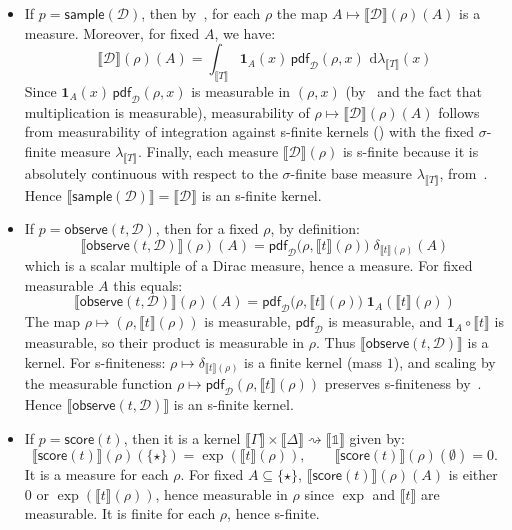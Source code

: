 \documentclass[preprint]{uai2026} %
\newcommand{\unittype}{\mathbb{1}}
\newcommand{\sem}[1]{\llbracket #1 \rrbracket}
\newcommand{\kto}{\rightsquigarrow}
\newcommand{\sample}[1]{\mathsf{sample}(#1)}
\newcommand{\observe}[2]{\mathsf{observe}(#1,#2)}
\newcommand{\score}[1]{\mathsf{score}(#1)}
\newcommand{\pdf}{\mathsf{pdf}}
\newcommand{\dd}{\,\mathrm{d}}
\begin{document}
\begin{proofE}
\begin{itemize}
\item If $p=\sample{\mathcal{D}}$, then by~, for each $\rho$ the map $A\mapsto \sem{\mathcal{D}}(\rho)(A)$ is a measure. Moreover, for fixed $A$, we have:
\[
\sem{\mathcal{D}}(\rho)(A)=\int_{\sem{T}} \mathbf{1}_A(x)\,\pdf_{\mathcal{D}}(\rho,x)\,\dd\lambda_{\sem{T}}(x)
\]
Since $\mathbf{1}_A(x)\,\pdf_{\mathcal{D}}(\rho,x)$ is measurable in $(\rho,x)$ (by~ and the fact that multiplication is measurable), measurability of
$\rho\mapsto \sem{\mathcal{D}}(\rho)(A)$ follows from measurability of integration against s-finite kernels () with the fixed $\sigma$-finite measure $\lambda_{\sem{T}}$.
Finally, each measure $\sem{\mathcal{D}}(\rho)$ is s-finite because it is absolutely continuous with respect to the
$\sigma$-finite base measure $\lambda_{\sem{T}}$, from~. Hence $\sem{\sample{\mathcal{D}}}=\sem{\mathcal{D}}$ is an s-finite kernel.
\item If $p=\observe{t}{\mathcal{D}}$, then for a fixed $\rho$, by definition:
\[
\sem{\observe{t}{\mathcal{D}}}(\rho)(A)
=
\pdf_{\mathcal{D}}\big(\rho,\sem{t}(\rho)\big)\;\delta_{\sem{t}(\rho)}(A)
\]
which is a scalar multiple of a Dirac measure, hence a measure.
For fixed measurable $A$ this equals:
\[
\sem{\observe{t}{\mathcal{D}}}(\rho)(A)
=
\pdf_{\mathcal{D}}\big(\rho,\sem{t}(\rho)\big)\;\mathbf{1}_A(\sem{t}(\rho))
\]
The map $\rho\mapsto (\rho,\sem{t}(\rho))$ is measurable, $\pdf_{\mathcal{D}}$ is measurable, and $\mathbf{1}_A\circ \sem{t}$
is measurable, so their product is measurable in $\rho$. Thus $\sem{\observe{t}{\mathcal{D}}}$ is a kernel.
For s-finiteness: $\rho\mapsto \delta_{\sem{t}(\rho)}$ is a finite kernel (mass $1$), and scaling by the measurable function
$\rho\mapsto \pdf_{\mathcal{D}}(\rho,\sem{t}(\rho))$ preserves s-finiteness by~. Hence
$\sem{\observe{t}{\mathcal{D}}}$ is an s-finite kernel.

\item If $p=\score{t}$, then it is a kernel $\sem{\Gamma}\times\sem{\Delta}\kto \sem{\unittype}$ given by:
\[
\sem{\score{t}}(\rho)(\{\star\})=\exp(\sem{t}(\rho)),\qquad \sem{\score{t}}(\rho)(\emptyset)=0.
\]
It is a measure for each $\rho$. For fixed $A\subseteq \{\star\}$, $\sem{\score{t}}(\rho)(A)$ is either $0$ or
$\exp(\sem{t}(\rho))$, hence measurable in $\rho$ since $\exp$ and $\sem{t}$ are measurable.
It is finite for each $\rho$, hence s-finite.


\end{itemize}
\end{proofE}
\end{document}
